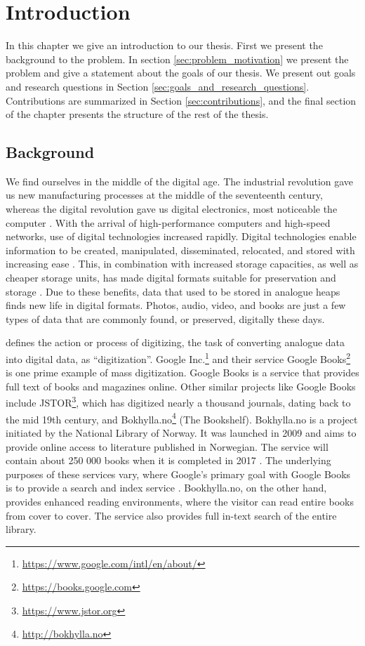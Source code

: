 
\chapter{Introduction}
\label{ch:introduction}
In this chapter we give an introduction to our thesis. First we present the background to the problem. In section \ref{sec:problem_motivation} we present the problem and give a statement about the goals of our thesis. We present out goals and research questions in Section \ref{sec:goals_and_research_questions}. Contributions are summarized in Section \ref{sec:contributions}, and the final section of the chapter presents the structure of the rest of the thesis.

\section{Background}
We find ourselves in the middle of the digital age. The industrial revolution gave us new manufacturing processes at the middle of the seventeenth century, whereas the digital revolution gave us digital electronics, most noticeable the computer \citep{freeman2001time}. With the arrival of high-performance computers and high-speed networks, use of digital technologies increased rapidly. Digital technologies enable information to be created, manipulated, disseminated, relocated, and stored with increasing ease \citep{lee2002state}. This, in combination with increased storage capacities, as well as cheaper storage units, has made digital formats suitable for preservation and storage \citep{morris2003evolution}. Due to these benefits, data that used to be stored in analogue heaps finds new life in digital formats. Photos, audio, video, and books are just a few types of data that are commonly found, or preserved, digitally these days.

\cite{misc-oed-digitization} defines the action or process of digitizing, the task of converting analogue data into digital data, as ``digitization''. Google Inc.\footnote{\url{https://www.google.com/intl/en/about/}} and their service Google Books\footnote{\url{https://books.google.com}} is one prime example of mass digitization. Google Books is a service that provides full text of books and magazines online. Other similar projects like Google Books include JSTOR\footnote{\url{https://www.jstor.org}}, which has digitized nearly a thousand journals, dating back to the mid 19th century, and Bokhylla.no\footnote{\url{http://bokhylla.no}} (The Bookshelf). Bokhylla.no is a project initiated by the National Library of Norway. It was launched in 2009 and aims to provide online access to literature published in Norwegian. The service will contain about 250 000 books when it is completed in 2017 \citep{misc-nb-digial-library}. The underlying purposes of these services vary, where Google's primary goal with Google Books is to provide a search and index service \citep{coyle2006mass}. Bookhylla.no, on the other hand, provides enhanced reading environments, where the visitor can read entire books from cover to cover. The service also provides full in-text search of the entire library. 

